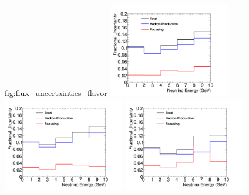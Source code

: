 \begin{dunefigure}{fig:flux_uncertainties_flavor}
    \includegraphics[width=0.4\textwidth]{graphics/error_overlay_nue_antineutrino_FD_opt.png}
        \includegraphics[width=0.4\textwidth]{graphics/error_overlay_nuebar_neutrino_FD_opt.png}
    \includegraphics[width=0.4\textwidth]{graphics/error_overlay_nuebar_antineutrino_FD_opt.png}
    \end{dunefigure}




